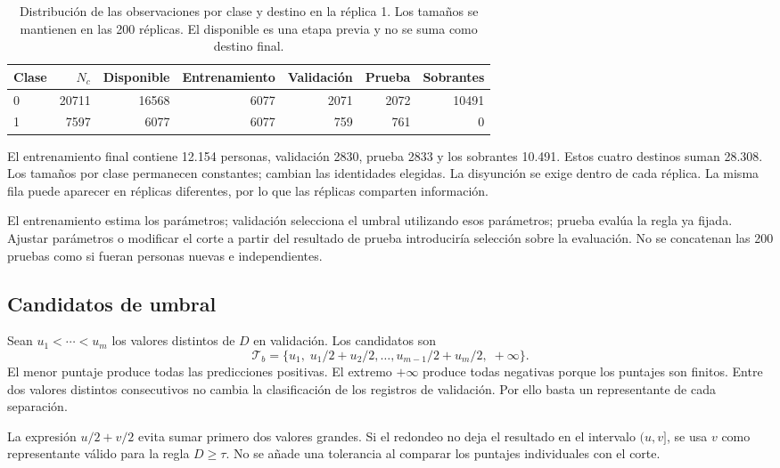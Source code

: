 \documentclass[11pt,a4paper]{article}
\begin{document}
\begin{table}[H]
\centering
\caption[Distribución de las observaciones por clase y destino en la réplica 1.]{Distribución de las observaciones por clase y destino en la réplica 1. Los tamaños se mantienen en las 200 réplicas. El disponible es una etapa previa y no se suma como destino final.}\label{tab:tamanos}
\small
\setlength{\tabcolsep}{4pt}
\begin{tabular}{lrrrrrr}
\toprule
Clase & $N_c$ & Disponible & Entrenamiento & Validación & Prueba & Sobrantes \\
\midrule
0 & 20711 & 16568 & 6077 & 2071 & 2072 & 10491 \\
1 & 7597 & 6077 & 6077 & 759 & 761 & 0 \\
\bottomrule
\end{tabular}
\end{table}

El entrenamiento final contiene 12.154 personas, validación 2830, prueba 2833 y los sobrantes 10.491. Estos cuatro destinos suman 28.308. Los tamaños por clase permanecen constantes; cambian las identidades elegidas. La disyunción se exige dentro de cada réplica. La misma fila puede aparecer en réplicas diferentes, por lo que las réplicas comparten información.

El entrenamiento estima los parámetros; validación selecciona el umbral utilizando esos parámetros; prueba evalúa la regla ya fijada. Ajustar parámetros o modificar el corte a partir del resultado de prueba introduciría selección sobre la evaluación. No se concatenan las 200 pruebas como si fueran personas nuevas e independientes.

\subsection{Candidatos de umbral}
Sean $u_1<\cdots<u_m$ los valores distintos de $D$ en validación. Los candidatos son
\begin{equation}
\mathcal T_b=\{u_1,\;u_1/2+u_2/2,\ldots,u_{m-1}/2+u_m/2,\;+\infty\}.
\end{equation}
El menor puntaje produce todas las predicciones positivas. El extremo $+\infty$ produce todas negativas porque los puntajes son finitos. Entre dos valores distintos consecutivos no cambia la clasificación de los registros de validación. Por ello basta un representante de cada separación.

La expresión $u/2+v/2$ evita sumar primero dos valores grandes. Si el redondeo no deja el resultado en el intervalo $(u,v]$, se usa $v$ como representante válido para la regla $D\geq\tau$. No se añade una tolerancia al comparar los puntajes individuales con el corte.
\end{document}
